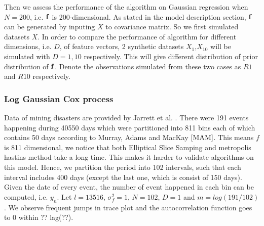 \documentclass{article}
\begin{document}

Then we assess the performance of the algorithm on Gaussian regression when $N=200$, i.e. $\bf{f}$ is 200-dimensional. As stated in the model description section, $\bf{f}$ can be generated by inputing $X$ to covariance matrix. So we first simulated datasets $X$. In order to compare the performance of algorithm for different dimensions, i.e. $D$, of feature vectors, 2 synthetic datasets $X_1$,$X_10$ will be simulated with $D = 1,10$ respectively. This will give different distribution of prior distribution of $\bf{f}$. Denote the observations simulated from these two cases as $R1$ and $R10$ respectively.

\subsubsection{Log Gaussian Cox process}

Data of mining disasters are provided by Jarrett et al. \cite{Jarrett}. There were 191 events happening during 40550 days which were partitioned into 811 bins each of which contains 50 days according to Murray, Adams and MacKay $\cite{MAM}$. This means $f$ is 811 dimensional, we notice that both Elliptical Slice Samping and metropolis hastins method take a long time. This makes it harder to validate algorithms on this model. Hence, we partition the period into 102 intervals, such that each interval includes 400 days (except the last one, which is consist of 150 days). Given the date of every event, the number of event happened in each bin can be computed, i.e. $y_n$. Let $l=13516$, $\sigma_f^2 = 1$, $N = 102$, $D=1$ and $m=log(191/102)$. We observe frequent jumps in trace plot and the autocorrelation function goes to 0 within ?? lag(??).
\end{document}
